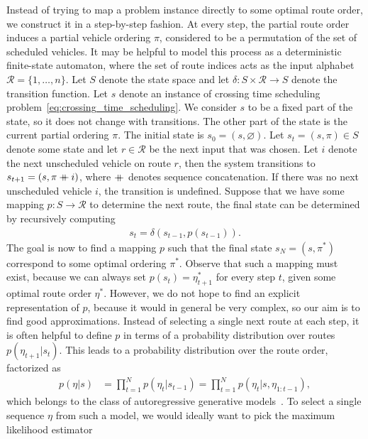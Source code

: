 \documentclass[a4paper]{article}
\newcommand\mdoubleplus{\mathbin{+\mkern-10mu+}}
\theoremstyle{definition}
\theoremstyle{plain}
\begin{document}
Instead of trying to map a problem instance directly to some optimal route
order, we construct it in a step-by-step fashion. At every step, the partial
route order induces a partial vehicle ordering $\pi$, considered to be a
permutation of the set of scheduled vehicles.
%
It may be helpful to model this process as a deterministic finite-state
automaton, where the set of route indices acts as the input alphabet
$\mathcal{R} = \{ 1, \dots, n \}$. Let $S$ denote the state space and let
$\delta: S \times \mathcal{R} \rightarrow S$ denote the transition function.
Let $s$ denote an instance of crossing time scheduling
problem~\eqref{eq:crossing_time_scheduling}. We consider $s$ to be a fixed part
of the state, so it does not change with transitions. The other part of the
state is the current partial ordering $\pi$. The initial state is
$s_{0} = (s, \varnothing)$.
Let $s_{t} = (s, \pi) \in S$ denote some state and let $r \in \mathcal{R}$ be the next
input that was chosen. Let $i$ denote the next unscheduled vehicle on route $r$,
then the system transitions to $s_{t+1} = (s, \pi \mdoubleplus i)$, where
$\mdoubleplus$ denotes sequence concatenation. If there was no next unscheduled
vehicle $i$, the transition is undefined.
%
Suppose that we have some mapping $p : S \rightarrow \mathcal{R}$ to determine the next
route, the final state can be determined by recursively computing
\begin{align*}
  s_{t} = \delta(s_{t-1}, p(s_{t-1})) .
\end{align*}
%
The goal is now to find a mapping $p$ such that the final state
$s_{N} = (s, \pi^{*})$ correspond to some optimal ordering $\pi^{*}$.
%
Observe that such a mapping must exist, because we can always set
$p(s_{t}) = \eta^{*}_{t+1}$ for every step $t$, given some optimal route order
$\eta^{*}$. However, we do not hope to find an explicit representation of $p$,
because it would in general be very complex, so our aim is to find good
approximations.
%
Instead of selecting a single next route at each step, it is often helpful to
define $p$ in terms of a probability distribution over routes
$p(\eta_{t+1} | s_{t})$. This leads to a probability distribution over the route
order, factorized as
\begin{align*}
  p(\eta | s) &= \prod_{t=1}^{N} p(\eta_{t} | s_{t-1}) = \prod_{t=1}^{N} p(\eta_{t} | s, \eta_{1:t-1}) ,
\end{align*}
which belongs to the class of autoregressive generative
models~\cite{tomczakDeepGenerativeModeling2024}.
%
To select a single sequence $\eta$ from such a model, we would ideally want to pick the maximum likelihood estimator
\end{document}
